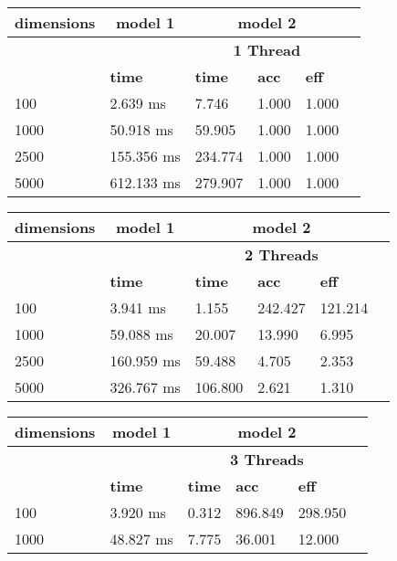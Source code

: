 \documentclass{article}
\begin{document}
\begin{table}
\begin{tabular}{|l|l|l|l|l|l|}\hline
\multicolumn{1}{|c|}{\textbf{dimensions}} &\multicolumn{1}{|c|}{\textbf{model 1}} &\multicolumn{3}{|c|}{\textbf{model 2}}\\ \hline
& & \multicolumn{3}{c|}{\textbf{1 Thread}} \\ \hline
& \textbf{time} & \textbf{time} & \textbf{acc} & \textbf{eff}\\ \hline
100
 & 2.639 ms & 7.746 & 1.000 & 1.000\\ \hline
1000
 & 50.918 ms & 59.905 & 1.000 & 1.000\\ \hline
2500
 & 155.356 ms & 234.774 & 1.000 & 1.000\\ \hline
5000
 & 612.133 ms & 279.907 & 1.000 & 1.000\\ \hline
\end{tabular}
\end{table}\begin{table}
\begin{tabular}{|l|l|l|l|l|l|}\hline
\multicolumn{1}{|c|}{\textbf{dimensions}} &\multicolumn{1}{|c|}{\textbf{model 1}} &\multicolumn{3}{|c|}{\textbf{model 2}}\\ \hline
& & \multicolumn{3}{c|}{\textbf{2 Threads}} \\ \hline
& \textbf{time} & \textbf{time} & \textbf{acc} & \textbf{eff}\\ \hline
100
 & 3.941 ms & 1.155 & 242.427 & 121.214\\ \hline
1000
 & 59.088 ms & 20.007 & 13.990 & 6.995\\ \hline
2500
 & 160.959 ms & 59.488 & 4.705 & 2.353\\ \hline
5000
 & 326.767 ms & 106.800 & 2.621 & 1.310\\ \hline
\end{tabular}
\end{table}\begin{table}
\begin{tabular}{|l|l|l|l|l|l|}\hline
\multicolumn{1}{|c|}{\textbf{dimensions}} &\multicolumn{1}{|c|}{\textbf{model 1}} &\multicolumn{3}{|c|}{\textbf{model 2}}\\ \hline
& & \multicolumn{3}{c|}{\textbf{3 Threads}} \\ \hline
& \textbf{time} & \textbf{time} & \textbf{acc} & \textbf{eff}\\ \hline
100
 & 3.920 ms & 0.312 & 896.849 & 298.950\\ \hline
1000
 & 48.827 ms & 7.775 & 36.001 & 12.000\\ \hline

\end{tabular}
\end{table}
\end{document}
